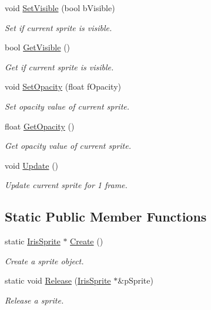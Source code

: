 \begin{DoxyCompactItemize}
void \hyperlink{class_iris2_d_1_1_iris_sprite_aae4592abf843276138b5805eb030575e}{Set\+Visible} (bool b\+Visible)
\begin{DoxyCompactList}\small\item\em Set if current sprite is visible. \end{DoxyCompactList}\item 
bool \hyperlink{class_iris2_d_1_1_iris_sprite_afb65bc13767cb566233cf4c14b4288bd}{Get\+Visible} ()
\begin{DoxyCompactList}\small\item\em Get if current sprite is visible. \end{DoxyCompactList}\item 
void \hyperlink{class_iris2_d_1_1_iris_sprite_a8f32660ac464af824864c2af8c883039}{Set\+Opacity} (float f\+Opacity)
\begin{DoxyCompactList}\small\item\em Set opacity value of current sprite. \end{DoxyCompactList}\item 
float \hyperlink{class_iris2_d_1_1_iris_sprite_a59358690f1becb15facd176a9bba4096}{Get\+Opacity} ()
\begin{DoxyCompactList}\small\item\em Get opacity value of current sprite. \end{DoxyCompactList}\item 
void \hyperlink{class_iris2_d_1_1_iris_sprite_a755c2896a54ad43d68db2993477b900a}{Update} ()
\begin{DoxyCompactList}\small\item\em Update current sprite for 1 frame. \end{DoxyCompactList}\end{DoxyCompactItemize}
\subsection*{Static Public Member Functions}
\begin{DoxyCompactItemize}
\item 
static \hyperlink{class_iris2_d_1_1_iris_sprite}{Iris\+Sprite} $\ast$ \hyperlink{class_iris2_d_1_1_iris_sprite_ab68ea873fcd8521324c8497455dee852}{Create} ()
\begin{DoxyCompactList}\small\item\em Create a sprite object. \end{DoxyCompactList}\item 
static void \hyperlink{class_iris2_d_1_1_iris_sprite_aa225c6483e0282375187b092ea0cecf9}{Release} (\hyperlink{class_iris2_d_1_1_iris_sprite}{Iris\+Sprite} $\ast$\&p\+Sprite)
\begin{DoxyCompactList}\small\item\em Release a sprite. \end{DoxyCompactList}\end{DoxyCompactItemize}


